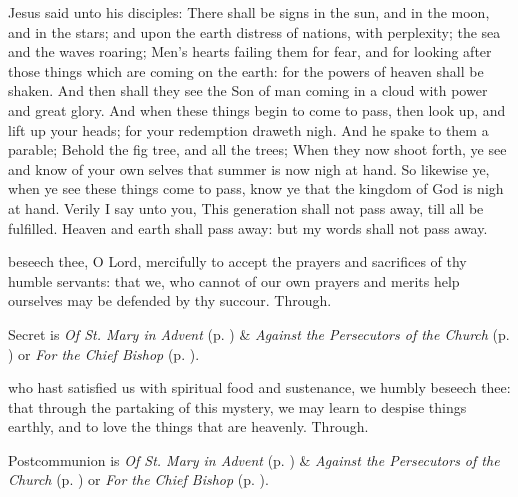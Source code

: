 
\vspace{-1ex}

 Jesus said unto his disciples: There shall be signs in the sun, and in the moon, and in the stars; and upon the earth distress of nations, with perplexity; the sea and the waves roaring; Men's hearts failing them for fear, and for looking after those things which are coming on the earth: for the powers of heaven shall be shaken. And then shall they see the Son of man coming in a cloud with power and great glory. And when these things begin to come to pass, then look up, and lift up your heads; for your redemption draweth nigh. And he spake to them a parable; Behold the fig tree, and all the trees; When they now shoot forth, ye see and know of your own selves that summer is now nigh at hand. So likewise ye, when ye see these things come to pass, know ye that the kingdom of God is nigh at hand. Verily I say unto you, This generation shall not pass away, till all be fulfilled. Heaven and earth shall pass away: but my words shall not pass away.

\secret
{} beseech thee, O Lord, mercifully to accept the prayers and sacrifices of thy humble servants: that we, who cannot of our own prayers and merits help ourselves may be defended by thy succour. Through.
\begin{rubric}
     Secret is \emph{Of St. Mary in Advent} (p. \pageref{SPMaryInAdvent}) \&  \emph{Against the Persecutors of the Church} (p. \pageref{SPAgainst}) or \emph{For the Chief Bishop} (p. \pageref{SPChiefBishop}).
\end{rubric}

\vspace{-1ex}


\vspace{-1ex}

\postcommunion
{} who hast satisfied us with spiritual food and sustenance, we humbly beseech thee: that through the partaking of this mystery, we may learn to despise things earthly, and to love the things that are heavenly. Through.
\begin{rubric}
     Postcommunion is \emph{Of St. Mary in Advent} (p. \pageref{SPMaryInAdvent}) \&  \emph{Against the Persecutors of the Church} (p. \pageref{SPAgainst}) or \emph{For the Chief Bishop} (p. \pageref{SPChiefBishop}).
\end{rubric}



